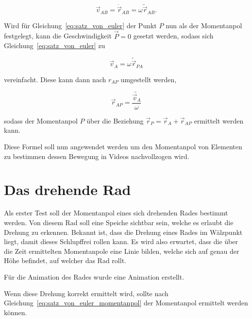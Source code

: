 \begin{equation}
    \vec{v}_{AB} = \dot{\vec{r}}_{AB} = \omega \tilde{\vec{r}}_{AB}.
    \label{eq:absolut_zu_winkel}
\end{equation}

Wird für Gleichung~\ref{eq:satz_von_euler} der Punkt $P$ nun als der Momentanpol festgelegt, kann die Geschwindigkeit $\vec{P} = 0$ gesetzt werden,
sodass sich Gleichung~\ref{eq:satz_von_euler} zu

\begin{equation}
    \vec{v}_A = \omega \tilde{\vec{r}}_{PA}
    \label{eq:satz_von_euler_momentanpol}
\end{equation}

vereinfacht. 
Diese kann dann nach $r_{AP}$ umgestellt werden,

\begin{equation}
    \vec{r}_{AP} = \frac{\tilde{\vec{v}_A}}{\omega}
\end{equation}

sodass der Momentanpol $P$ über die Beziehung $\vec{r}_P = \vec{r}_A + \vec{r}_{AP}$ ermittelt werden kann.

Diese Formel soll nun angewendet werden um den Momentanpol von Elementen zu bestimmen dessen Bewegung in Videos nachvollzogen wird.

\section{Das drehende Rad}

Als erster Test soll der Momentanpol eines sich drehenden Rades bestimmt werden.
Von diesem Rad soll eine Speiche sichtbar sein, welche es erlaubt die Drehung zu erkennen.
Bekannt ist, dass die Drehung eines Rades im Wälzpunkt liegt, damit dieses Schlupffrei rollen kann.
Es wird also erwartet, dass die über die Zeit ermittelten Momentanpole eine Linie bilden, welche sich auf genau der Höhe befindet, auf welcher das Rad rollt.

Für die Animation des Rades wurde eine  Animation erstellt.



Wenn diese Drehung korrekt ermittelt wird, sollte nach Gleichung~\ref{eq:satz_von_euler_momentanpol} der Momentanpol ermittelt werden können.


